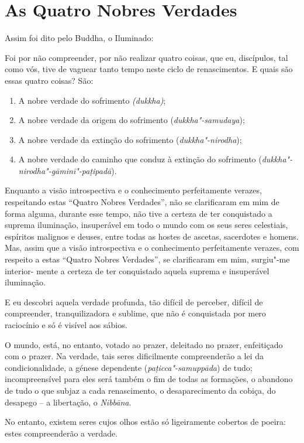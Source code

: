\chapter{As Quatro Nobres Verdades}

Assim foi dito pelo Buddha, o Iluminado:

Foi por não compreender, por não realizar quatro coisas, que eu, discípulos, tal
como vós, tive de vaguear tanto tempo neste ciclo de renascimentos. E quais são
essas quatro coisas? São:

\begin{enumerate}
  \item A nobre verdade do sofrimento \emph{(dukkha)};

  \item A nobre verdade da origem do sofrimento (\emph{dukkha"-samudaya});

  \item A nobre verdade da extinção do sofrimento (\emph{dukkha"-nirodha});

  \item A nobre verdade do caminho que conduz à extinção do sofrimento (\emph{dukkha"-nirodha"-gāminī"-paṭipadā}).
\end{enumerate}


Enquanto a visão introspectiva e o conhecimento perfeitamente verazes,
respeitando estas “Quatro Nobres Verdades”, não se clarificaram em mim de
forma alguma, durante esse tempo, não tive a certeza de ter conquistado a
suprema iluminação, insuperável em todo o mundo com os seus seres celestiais,
espíritos malignos e deuses, entre todas as hostes de ascetas, sacerdotes e
homens. Mas, assim que a visão introspectiva e o conhecimento perfeitamente
verazes, com respeito a estas “Quatro Nobres Verdades”, se clarificaram em
mim, surgiu"-me interior- mente a certeza de ter conquistado aquela suprema e
insuperável iluminação.


E eu descobri aquela verdade profunda, tão difícil de perceber, difícil de
compreender, tranquilizadora e sublime, que não é conquistada por mero
raciocínio e só é visível aos sábios.


O mundo, está, no entanto, votado ao prazer, deleitado no prazer, enfeitiçado
com o prazer. Na verdade, tais seres dificilmente compreenderão a lei da
condicionalidade, a génese dependente (\emph{paṭicca"-samuppāda}) de tudo;
incompreensível para eles será também o fim de todas as formações, o abandono de
tudo o que subjaz a cada renascimento, o desaparecimento da cobiça, do desapego
-- a libertação, o \emph{Nibbāna}.

No entanto, existem seres cujos olhos estão só ligeiramente cobertos de poeira:
estes compreenderão a verdade.

